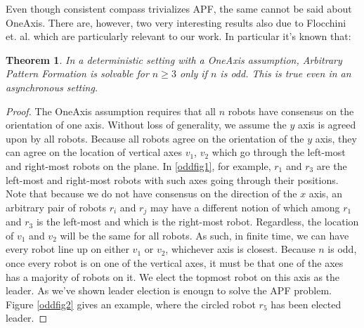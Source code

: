 \documentclass[preprint,10pt]{elsarticle}
\newtheorem{theorem}{Theorem}
\begin{document}
	Even though consistent compass trivializes APF, the same cannot be said about OneAxis. There are, however,
	two very interesting results also due to Flocchini et. al. which are particularly relevant to our work.
	In particular it's known that:
	\begin{theorem} 
		In a deterministic setting with a \textit{OneAxis} assumption, 
		Arbitrary Pattern Formation is solvable for $n \geq 3$ only if $n$ is odd. This is true even in 
		an asynchronous setting.\cite{flocchini08arbitrary}
	\end{theorem} 

	\begin{proof}
		The OneAxis assumption requires that all $n$ robots have consensus on the orientation of one axis. 
		Without loss of generality, we assume the $y$ axis is agreed upon by all robots. Because all robots
		agree on the orientation of the $y$ axis, they can agree on the location of vertical axes $v_1$, 
		$v_2$ which go through the left-most and right-most robots on the plane. In \ref{oddfig1}, for example,
		$r_1$ and $r_3$ are the left-most and right-most robots with such axes going through their positions.
		Note that because we do not have consensus on the direction of the $x$ axis, an arbitrary pair of robots
		$r_i$ and $r_j$ may have a different notion of which among $r_1$ and $r_3$ is the left-most and which is
		the right-most robot. Regardless, the location of $v_1$ and $v_2$ will be the same for all robots.
		As such, in finite time, we can have every robot line up on either $v_1$ or $v_2$, whichever
		axis is closest. Because $n$ is odd, once every robot is on one of the vertical axes, it must
		be that one of the axes has a majority of robots on it. We elect the topmost robot
		on this axis as the leader. As we've shown leader election is enougn to solve the APF problem.
		Figure \ref{oddfig2} gives an example, where the circled robot $r_5$ has been elected leader.
	\end{proof}
\end{document}
